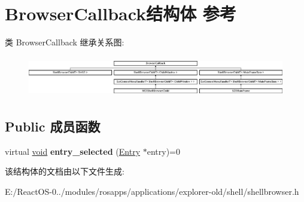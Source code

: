 \hypertarget{struct_browser_callback}{}\section{Browser\+Callback结构体 参考}
\label{struct_browser_callback}
类 Browser\+Callback 继承关系图\+:\begin{figure}[H]
\begin{center}
\leavevmode
\includegraphics[height=1.803543cm]{struct_browser_callback}
\end{center}
\end{figure}
\subsection*{Public 成员函数}
\begin{DoxyCompactItemize}
\item 
\mbox{\label{struct_browser_callback_a54bbb536e700ce8be1ea9fb150b73c2d}} 
virtual \hyperlink{interfacevoid}{void} {\bfseries entry\+\_\+selected} (\hyperlink{struct_entry}{Entry} $\ast$entry)=0
\end{DoxyCompactItemize}


该结构体的文档由以下文件生成\+:\begin{DoxyCompactItemize}
\item 
E\+:/\+React\+O\+S-\/0../modules/rosapps/applications/explorer-\/old/shell/shellbrowser.\+h\end{DoxyCompactItemize}

